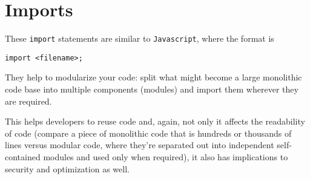 \section{Imports}\label{imports}

These \texttt{import} statements are similar to \texttt{Javascript},
where the format is

\begin{lstlisting}[language=Solidity,numbers=none]
import <filename>;
\end{lstlisting}

They help to modularize your code: split what might become a large
monolithic code base into multiple components (modules) and import them
wherever they are required.

This helps developers to reuse code and, again, not only it affects the
readability of code (compare a piece of monolithic code that is hundreds
or thousands of lines versus modular code, where they're separated out
into independent self-contained modules and used only when required), it
also has implications to security and optimization as well.
